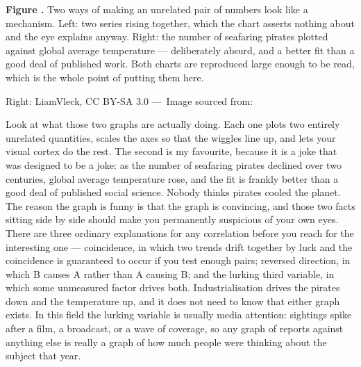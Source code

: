 \Needspace*{4.2in}
\begin{center}
\label{fig:corrcausetrio}%
\begin{figpanel}[width=0.96\textwidth]
\centering
{\setlength{\fboxsep}{0pt}\setlength{\fboxrule}{0.5pt}%
\hfill
{}}\par\vspace{3pt}
{\RaggedRight\scriptsize\color{steel}\textbf{\textcolor{ufogreenink}{Figure \thefigph.}}
Two ways of making an unrelated pair of numbers look like a mechanism. Left: two series rising
together, which the chart asserts nothing about and the eye explains anyway. Right: the
number of seafaring pirates plotted against global average temperature --- deliberately absurd, and
a better fit than a good deal of published work. Both charts are reproduced large enough to be read,
which is the whole point of putting them here.\par
{} \par
{\color{midgrey} Right: LiamVleck, CC BY-SA 3.0 ---\ Image sourced from:} \par}
\end{figpanel}
\end{center}
\vspace{6pt}

Look at what those two graphs are actually doing. Each one plots two entirely unrelated
quantities, scales the axes so that the wiggles line up, and lets your visual cortex do the rest.
The second is my favourite, because it is a joke that was designed to be a joke: as the number of
seafaring pirates declined over two centuries, global average temperature rose, and the fit is
frankly better than a good deal of published social science. Nobody thinks pirates cooled the
planet. The reason the graph is funny is that the graph is convincing, and those two facts sitting
side by side should make you permanently suspicious of your own eyes. There are three ordinary
explanations for any correlation before you reach for the interesting one --- coincidence, in which
two trends drift together by luck and the coincidence is guaranteed to occur if you test enough
pairs; reversed direction, in which B causes A rather than A causing B; and the lurking third
variable, in which some unmeasured factor drives both. Industrialisation drives the pirates down and
the temperature up, and it does not need to know that either graph exists.  In this field the lurking variable is
usually media attention: sightings spike after a film, a broadcast, or a wave of coverage, so any
graph of reports against anything else is really a graph of how much people were thinking about the
subject that year.

